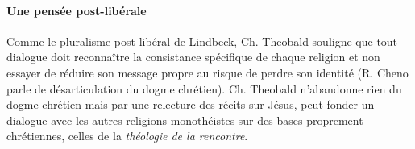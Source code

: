 \begin{comment}
    
\paragraph{mystiques, facile de traverser les religions} On a toujours enseigné, dans chacun des monothéismes. que l'Unique ne fait pas nombre avec ceux qui témoignent de lui. Ce type d'argument, si familier aux mystiques, consiste à critiquer nos représentations de Dieu, à développer toute une série de procédures à la fois intellectuelles et affectives pour approcher corporellement le mystère du Dieu tout autre. Les spirituels de tradition différente se rencontrent sur ces voies à la fois ascétiques et mystiques; ils traversent aisément les frontières entre les religions parce que, pour eux, un espace infini de communication avec autrui s'est ouvert dans la différence indépassable entre Dieu et ce qu'on peut dire de lui.

\paragraph{mystique pas facile pour christianisme du fait de l'incarnation qui nous dévoile le père, qui n'est pas ineffable}
Relativement bien ajusté au monothéisme juif et musulman, ce type d'expérience mystique se heurte, en christianisme, au mystère de l'Incarnation: \begin{quote}
    « Personne n'a jamais vu Dieu; le Fils unique, qui est dans le sein du Père, nous l'a dévoilé » (Jn 1, 18).
\end{quote} 

\paragraph{risque du mystique d'éluder la question - car elle ne l'intéresse pas ? }Peut-être doit-on ajouter que le spirituel, qui relativise les différences entre les trois monothéismes. risque de ne plus se laisser interroger par la discordance des témoignages qui discrédite toujours la cause elle-même.
 
\end{comment}
 
\paragraph{Une pensée post-libérale} Comme le pluralisme post-libéral de Lindbeck, Ch. Theobald souligne  que tout dialogue doit reconnaître la consistance spécifique de chaque religion et non essayer de réduire son message propre au risque de perdre son identité (R. Cheno parle de désarticulation du dogme chrétien). Ch. Theobald n'abandonne rien du dogme chrétien mais par une relecture des récits sur Jésus, peut fonder un dialogue avec les autres religions monothéistes sur des bases proprement chrétiennes, celles de la\textit{ théologie de la rencontre}. 
 
